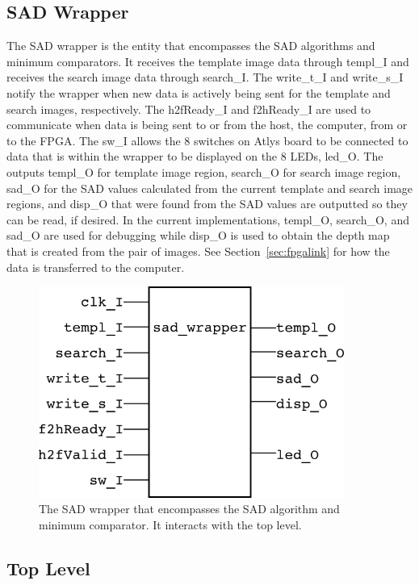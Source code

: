 \subsection{SAD Wrapper}

The SAD wrapper is the entity that encompasses the SAD algorithms and minimum comparators. It receives the template image data through templ\_I and receives the search image data through search\_I. The write\_t\_I and write\_s\_I notify the wrapper when new data is actively being sent for the template and search images, respectively. The h2fReady\_I and f2hReady\_I are used to communicate when data is being sent to or from the host, the computer, from or to the FPGA. The sw\_I allows the 8 switches on Atlys board to be connected to data that is within the wrapper to be displayed on the 8 LEDs, led\_O. The outputs templ\_O for template image region, search\_O for search image region, sad\_O for the SAD values calculated from the current template and search image regions, and disp\_O that were found from the SAD values are outputted so they can be read, if desired. In the current implementations, templ\_O, search\_O, and sad\_O are used for debugging while disp\_O is used to obtain the depth map that is created from the pair of images. See Section~\ref{sec:fpgalink} for how the data is transferred to the computer.

\begin{figure}[h]
	\begin{center}
		\includegraphics[width=100mm]{figures/sad_wrapper_rtl.png}
		\captionfonts
		\caption{The SAD wrapper that encompasses the SAD algorithm and minimum comparator. It interacts with the top level.}
		\label{fig:sadWrapper_rtl}
	\end{center}
\end{figure}

\subsection{Top Level}

